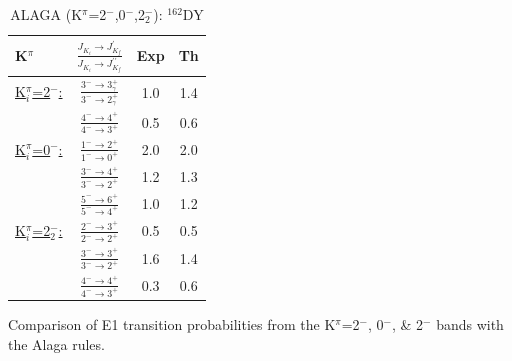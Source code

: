 \begin{table}
\begin{center}
\caption{ALAGA (K$^\pi$=2$^-$,0$^-$,2$^-_2$): $^{162}$DY \label{tab:162Dy_negparity_ALAGA}}
\begin{tabular}{l c c|c}
K$^\pi$ & $\frac{J_{K_i}\rightarrow J^\prime_{K_f}}{J_{K_i}\rightarrow J^{\prime\prime}_{K_f}}$ & Exp & Th \\
\hline
\hline
\underline{K$^\pi_i$=2$^-$:}   & $\frac{3^-\rightarrow3^+_\gamma}{3^-\rightarrow2^+_\gamma}$ & 1.0 & 1.4 \\
                               & $\frac{4^-\rightarrow4^+}{4^-\rightarrow3^+}$ & 0.5 & 0.6 \\ \hline
\underline{K$^\pi_i$=0$^-$:}   & $\frac{1^-\rightarrow2^+}{1^-\rightarrow0^+}$ & 2.0 & 2.0 \\
                               & $\frac{3^-\rightarrow4^+}{3^-\rightarrow2^+}$ & 1.2 & 1.3 \\
                               & $\frac{5^-\rightarrow6^+}{5^-\rightarrow4^+}$ & 1.0 & 1.2 \\  \hline
\underline{K$^\pi_i$=2$^-_2$:} & $\frac{2^-\rightarrow3^+}{2^-\rightarrow2^+}$ & 0.5 & 0.5 \\
                               & $\frac{3^-\rightarrow3^+}{3^-\rightarrow2^+}$ & 1.6 & 1.4 \\
                               & $\frac{4^-\rightarrow4^+}{4^-\rightarrow3^+}$ & 0.3 & 0.6 \\ \hline

\end{tabular}
\end{center}
Comparison of E1 transition probabilities from the K$^\pi$=2$^-$, 0$^-$, \& 2$^-$ bands with the Alaga rules.
\end{table}

